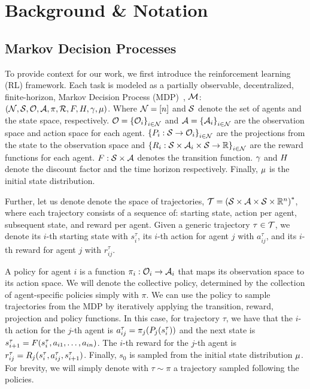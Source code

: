 \section{Background \& Notation}\label{sect:background}

\subsection{Markov Decision Processes}
To provide context for our work, we first introduce the reinforcement learning (RL) framework. Each task is modeled as a partially observable, decentralized, finite-horizon, Markov Decision Process (MDP)~\cite{Shapley53}, $\mathcal{M}$: $(\mathcal{N},\mathcal{S},\mathcal{O},\mathcal{A},\pi, \mathcal{R}, F, H, \gamma, \mu)$. Where $\mathcal{N}=[n]$ and $\mathcal{S}$ denote the set of agents and the state space, respectively. $\mathcal{O}={\{\mathcal{O}_{i}\}}_{i\in\mathcal{N}}$ and $\mathcal{A}={\{\mathcal{A}_{i}\}}_{i\in\mathcal{N}}$ are the observation space and action space for each agent. ${\{P_{i}:\mathcal{S}\rightarrow\mathcal{O}_{i}\}}_{i\in\mathcal{N}}$ are the projections from the state to the observation space and ${\{R_{i}:\mathcal{S}\times\mathcal{A}_{i}\times\mathcal{S}\rightarrow\mathbb{R}\}}_{i\in\mathcal{N}}$ are the reward functions for each agent. $F:\mathcal{S}\times\mathcal{A}$ denotes the transition function. $\gamma$ and $H$ denote the discount factor and the time horizon respectively. Finally, $\mu$ is the initial state distribution.

Further, let us denote denote the space of trajectories, $\mathcal{T} = {\left(\mathcal{S}\times\mathcal{A}\times\mathcal{S}\times\mathbb{R}^{n}\right)}^*$, where each trajectory consists of a sequence of: starting state, action per agent, subsequent state, and reward per agent. Given a generic trajectory $\tau\in\mathcal{T}$, we denote its $i$-th starting state with $s_i^\tau$, its $i$-th action for agent $j$ with $a_{ij}^\tau$, and its $i$-th reward for agent $j$ with $r_{ij}^\tau$. 

A policy for agent $i$ is a function $\pi_{i}:\mathcal{O}_{i}\rightarrow\mathcal{A}_{i}$ that maps its observation space to its action space. We will denote the collective policy, determined by the collection of agent-specific policies simply with $\pi$. We can use the policy to sample trajectories from the MDP by iteratively applying the transition, reward, projection and policy functions. In this case, for trajectory $\tau$, we have that the $i$-th action for the $j$-th agent is $a_{ij}^\tau = \pi_{j}(P_{j}(s_i^\tau))$ and the next state is $s_{i+1}^\tau = F(s_i^\tau,a_{i1},\dots,a_{in})$. The $i$-th reward for the $j$-th agent is $r_{ij}^\tau = R_{j}(s_i^\tau,a_{ij}^\tau,s_{i+1}^\tau)$. Finally, $s_0$ is sampled from the initial state distribution $\mu$. For brevity, we will simply denote with $\tau\sim\pi$ a trajectory sampled following the policies.

